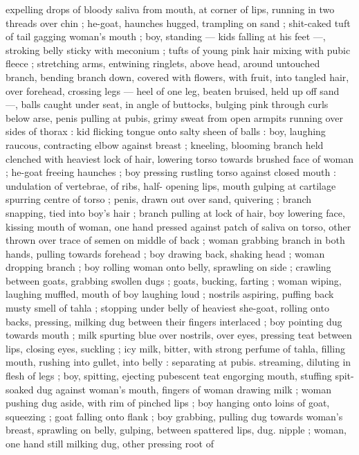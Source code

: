 expelling drops of bloody saliva from mouth, at corner of lips, 
running in two threads over chin ; he-goat, haunches hugged, 
trampling on sand ; shit-caked tuft of tail gagging woman's mouth ; 
boy, standing --- kids falling at his feet ---, stroking belly sticky with 
meconium ; tufts of young pink hair mixing with pubic fleece ; 
stretching arms, entwining ringlets, above head, around untouched 
branch, bending branch down, covered with flowers, with fruit, into 
tangled hair, over forehead, crossing legs --- heel of one leg, beaten 
bruised, held up off sand ---, balls caught under seat, in angle of 
buttocks, bulging pink through curls below arse, penis pulling at 
pubis, grimy sweat from open armpits running over sides of thorax : 
kid flicking tongue onto salty sheen of balls : boy, laughing raucous, 
contracting elbow against breast ; kneeling, blooming branch held 
clenched with heaviest lock of hair, lowering torso towards brushed 
face of woman ; he-goat freeing haunches ; boy pressing rustling 
torso against closed mouth : undulation of vertebrae, of ribs, half- 
opening lips, mouth gulping at cartilage spurring centre of torso ; 
penis, drawn out over sand, quivering ; branch snapping, tied into 
boy's hair ; branch pulling at lock of hair, boy lowering face, kissing 
mouth of woman, one hand pressed against patch of saliva on torso, 
other thrown over trace of semen on middle of back ; woman 
grabbing branch in both hands, pulling towards forehead ; boy 
drawing back, shaking head ; woman dropping branch ; boy rolling 
woman onto belly, sprawling on side ; crawling between goats, 
grabbing swollen dugs ; goats, bucking, farting ; woman wiping, 
laughing muffled, mouth of boy laughing loud ; nostrils aspiring, 
puffing back musty smell of tahla ; stopping under belly of heaviest 
she-goat, rolling onto backs, pressing, milking dug between their 
fingers interlaced ; boy pointing dug towards mouth ; milk spurting 
blue over nostrils, over eyes, pressing teat between lips, closing 
eyes, suckling ; icy milk, bitter, with strong perfume of tahla, filling 
mouth, rushing into gullet, into belly : separating at pubis. 
streaming, diluting in flesh of legs ; boy, spitting, ejecting pubescent 
teat engorging mouth, stuffing spit-soaked dug against woman's 
mouth, fingers of woman drawing milk ; woman pushing dug aside, 
with rim of pinched lips ; boy hanging onto loins of goat, squeezing 
; goat falling onto flank ; boy grabbing, pulling dug towards woman's 
breast, sprawling on belly, gulping, between spattered lips, dug. 
nipple ; woman, one hand still milking dug, other pressing root of 
